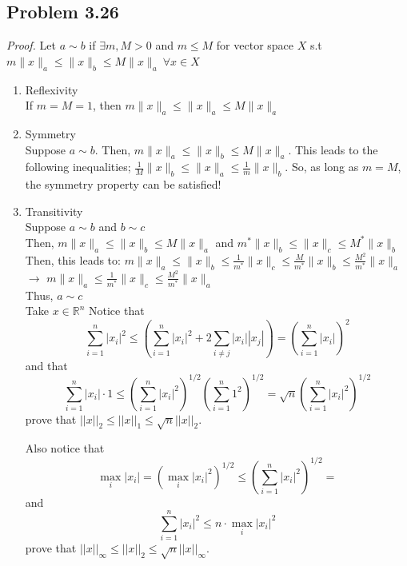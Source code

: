 \documentclass[letterpaper,12pt]{article}
\theoremstyle{definition}
\begin{document}
\begin{spacing}{1.3}{}
\subsection*{Problem 3.26}
\emph{Proof.} Let $a \sim b$ if $\exists m,M > 0$ and $m \leq M$ for vector space $X$ s.t $m \|x\|_{a} \leq \|x\|_{b} \leq M \|x\|_{a} \ \forall x \in X$ \
\begin{enumerate}
    \item
    Reflexivity\\
	If $m = M = 1$, then $m \|x\|_{a} \leq \|x\|_{a} \leq M \|x\|_{a}$ \
	\item
	Symmetry \\
	Suppose $a \sim b$. Then, $m \|x\|_{a} \leq \|x\|_{b} \leq M \|x\|_{a}$. This leads to the following inequalities; $\frac{1}{M} \|x\|_{b} \leq \|x\|_{a} \leq \frac{1}{m} \|x\|_{b}$. So, as long as $m=M$, the symmetry property can be satisfied! \
	\item
	Transitivity \\
	Suppose $a \sim b$ and $b \sim c$ \\
	Then, $m \|x\|_{a} \leq \|x\|_{b} \leq M \|x\|_{a}$ and $m^* \|x\|_{b} \leq \|x\|_{c} \leq M^* \|x\|_{b}$ \\
	Then, this leads to: $m \|x\|_{a} \leq \|x\|_{b} \leq \frac{1}{m^*} \|x\|_{c} \leq \frac{M}{m^*} \|x\|_b \leq \frac{M^2}{m^*} \|x\|_a$ $\rightarrow$ $m \|x\|_{a} \leq \frac{1}{m^*}\|x\|_{c} \leq \frac{M^2}{m^*} \|x\|_{a}$ \\
	Thus, $a \sim c$ \\
	Take $x\in\mathbb R^n$
	Notice that
	\begin{equation*}
	\sum_{i=1}^n|x_i|^2\leq
	\left(\sum_{i=1}^n|x_i|^2+2\sum_{i\neq j}|x_i||x_j|\right)=
	\left(\sum_{i=1}^n|x_i|\right)^2
	\end{equation*}
	and that
	\begin{equation*}
	\sum_{i=1}^n|x_i|\cdot1\leq
	\left(\sum_{i=1}^n|x_i|^2\right)^{1/2}\left(\sum_{i=1}^n1^2\right)^{1/2}=
	\sqrt{n}\left(\sum_{i=1}^n|x_i|^2\right)^{1/2}
	\end{equation*}
	prove that $||x||_2\leq||x||_1\leq\sqrt{n}||x||_2$.

	Also notice that
	\begin{equation*}
	\max_{i}|x_i|=\left(\max_i|x_i|^2\right)^{1/2}\leq
	\left(\sum_{i=1}^n|x_i|^2\right)^{1/2}=
	\end{equation*}
	and
	\begin{equation*}
	\sum_{i=1}^n|x_i|^2\leq n\cdot\max_i|x_i|^2
	\end{equation*}
	prove that $||x||_\infty\leq||x||_2\leq \sqrt{n}||x||_\infty$. \\


\end{enumerate}
\end{spacing}
\end{document}
